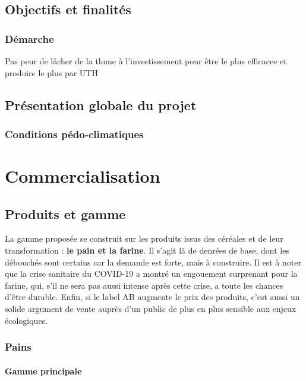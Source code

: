 \documentclass{book}
\begin{document}
\section{Objectifs et finalités}

\subsection{Démarche}

Pas peur de lâcher de la thune à l'investissement pour être le plus efficacee et produire le plus par UTH

\section{Présentation globale du projet}

\subsection{Conditions pédo-climatiques}

\chapter{Commercialisation}

\section{Produits et gamme}

La gamme proposée se construit sur les produits issus des céréales et de leur transformation : \textbf{le pain et la farine}. Il s'agit là de denrées de base, dont les débouchés sont certains car la demande est forte, mais à construire. Il est à noter que la crise sanitaire du COVID-19 a montré un engouement surprenant pour la farine, qui, s'il ne sera pas aussi intense après cette crise, a toute les chances d'être durable. Enfin, si le label AB augmente le prix des produits, c'est aussi un solide argument de vente auprès d'un public de plus en plus sensible aux enjeux écologiques. 

\subsection{Pains}
\label{part:pains}

\subsubsection{Gamme principale}
\end{document}
